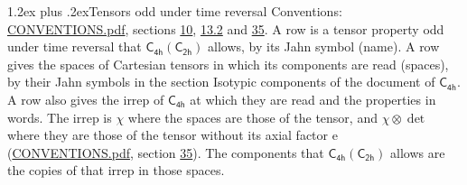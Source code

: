\documentclass[10pt,a4paper]{article}
\makeatletter
\renewcommand\section{\@startsection{section}{1}{\z@}{-3ex plus -1ex minus -.2ex}%
  {1.2ex plus .2ex}{\normalfont\large\sffamily\bfseries\color{parttitle}}}
\numberwithin{equation}{section}
\newcommand{\grp}[1]{\mathsf{#1}}
\newcommand{\irrprod}{\otimes}
\makeatother
\begin{document}
\section{Tensors odd under time reversal}\label{s:time_odd}
Conventions: \href{../../CONVENTIONS.pdf}{CONVENTIONS.pdf}, sections \href{../../../rotation/CONVENTIONS.pdf\#conv.10}{10}, \href{../../../rotation/CONVENTIONS.pdf\#conv.13.2}{13.2} and \href{../../CONVENTIONS.pdf\#conv.35}{35}.
\leavevmode\label{n:head.name.property}A row is a tensor property odd under time reversal that $\grp{C_{4h}}(\grp{C_{2h}})$ allows, by its Jahn symbol (name). \label{n:head.spaces}A row gives the spaces of Cartesian tensors in which its components are read (spaces), by their Jahn symbols in the section Isotypic components of the document of \href{../../../rotation/data/pdf/C4h.pdf}{$\grp{C_{4h}}$}. \label{n:head.properties}A row also gives the irrep of $\grp{C_{4h}}$ at which they are read and the properties in words. The irrep is $\chi$ where the spaces are those of the tensor, and $\chi \irrprod \det$ where they are those of the tensor without its axial factor e (\href{../../CONVENTIONS.pdf}{CONVENTIONS.pdf}, section \href{../../CONVENTIONS.pdf\#conv.35}{35}). The components that $\grp{C_{4h}}(\grp{C_{2h}})$ allows are the copies of that irrep in those spaces.
\end{document}
